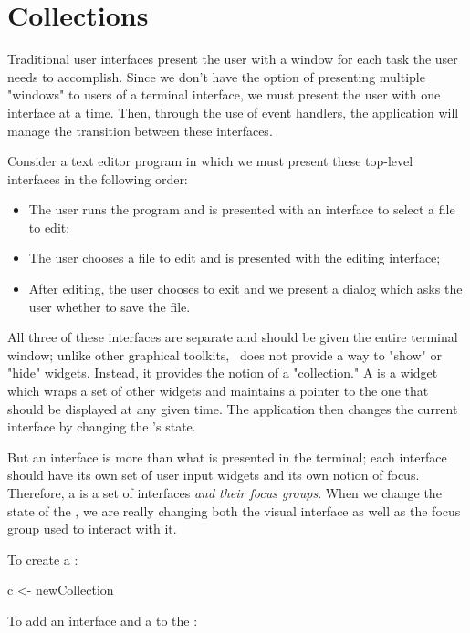 \section{Collections}
\label{sec:collections}

Traditional user interfaces present the user with a window for each
task the user needs to accomplish.  Since we don't have the option of
presenting multiple "windows" to users of a terminal interface, we
must present the user with one interface at a time.  Then, through the
use of event handlers, the application will manage the transition
between these interfaces.

Consider a text editor program in which we must present these top-level
interfaces in the following order:

\begin{itemize}
\item The user runs the program and is presented with an interface to
  select a file to edit;
\item The user chooses a file to edit and is presented with the
  editing interface;
\item After editing, the user chooses to exit and we present a dialog
  which asks the user whether to save the file.
\end{itemize}

All three of these interfaces are separate and should be given the
entire terminal window; unlike other graphical toolkits, \vtyui\ does
not provide a way to "show" or "hide" widgets.  Instead, it provides
the notion of a "collection."  A  is a widget which
wraps a set of other widgets and maintains a pointer to the one that
should be displayed at any given time.  The application then changes
the current interface by changing the 's state.

But an interface is more than what is presented in the terminal; each
interface should have its own set of user input widgets and its own
notion of focus.  Therefore, a  is a set of interfaces
\textit{and their focus groups}.  When we change the state of the
, we are really changing both the visual interface as
well as the focus group used to interact with it.

To create a :

\begin{haskellcode}
 c <- newCollection
\end{haskellcode}

To add an interface and a  to the :

